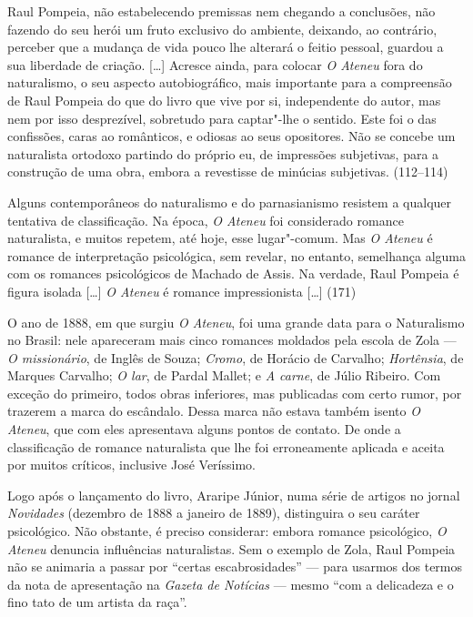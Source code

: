 Raul Pompeia, não estabelecendo premissas nem chegando a
conclusões, não fazendo do seu herói um fruto exclusivo do ambiente,
deixando, ao contrário, perceber que a mudança de vida pouco lhe
alterará o feitio pessoal, guardou a sua liberdade de criação. [\ldots]
Acresce ainda, para colocar \textit{O Ateneu} fora do naturalismo, o seu aspecto
autobiográfico, mais importante para a compreensão de Raul Pompeia
do que do livro que vive por si, independente do autor, mas nem por
isso desprezível, sobretudo para captar"-lhe o sentido. Este foi o das
confissões, caras ao românticos, e odiosas ao seus opositores. Não se
concebe um naturalista ortodoxo partindo do próprio eu, de impressões
subjetivas, para a construção de uma obra, embora a revestisse de
minúcias subjetivas. (112--114)



Alguns contemporâneos do naturalismo e do parnasianismo
resistem a qualquer tentativa de classificação. Na época,
\textit{O Ateneu} foi considerado romance
naturalista, e muitos repetem, até hoje, esse lugar"-comum. Mas
\textit{O Ateneu} é romance de interpretação
psicológica, sem revelar, no entanto, semelhança alguma com os
romances psicológicos de Machado de Assis. Na verdade, Raul Pompeia é
figura isolada [\ldots] \textit{O Ateneu} é
romance impressionista [\ldots] (171)



O ano de 1888, em que surgiu \textit{O
Ateneu}, foi uma grande data para o Naturalismo no
Brasil: nele apareceram mais cinco romances moldados pela escola de
Zola --- \textit{O missionário}, de Inglês
de Souza; \textit{Cromo}, de Horácio de
Carvalho; \textit{Hortênsia}, de Marques
Carvalho; \textit{O lar}, de Pardal Mallet;
e \textit{A carne}, de Júlio Ribeiro. Com
exceção do primeiro, todos obras inferiores, mas publicadas com certo
rumor, por trazerem a marca do escândalo. Dessa marca não estava também
isento \textit{O Ateneu}, que com eles
apresentava alguns pontos de contato. De onde a classificação de
romance naturalista que lhe foi erroneamente aplicada e aceita por
muitos críticos, inclusive José Veríssimo.

Logo após o lançamento do livro, Araripe Júnior, numa
série de artigos no jornal \textit{Novidades} (dezembro de 1888 a
janeiro de 1889), distinguira o seu caráter psicológico. Não obstante,
é preciso considerar: embora romance psicológico, \textit{O Ateneu} 
denuncia influências naturalistas. Sem o exemplo de Zola, Raul Pompeia 
não se animaria a passar por ``certas escabrosidades'' --- 
para usarmos dos termos da nota de apresentação na 
\textit{Gazeta de Notícias} --- mesmo ``com a delicadeza 
e o fino tato de um artista da raça''.


